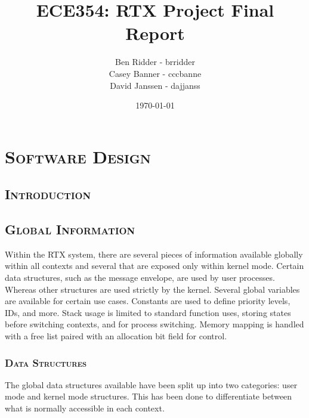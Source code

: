 \documentclass[oneside]{report}
\begin{document}
\lstset{language=C, 
        frame=single, 
        breaklines=true,
        basicstyle=\small\ttfamily,
        columns=fullflexible}


\title{ECE354: RTX Project Final Report}
\author{Ben Ridder - brridder \\
Casey Banner - cccbanne \\
David Janssen - dajjanss }
\date{\today}

\maketitle

\tableofcontents
\listoftables
\lstlistoflistings

\chapter{\textsc{Software Design}}

\section{\textsc{Introduction}}

\section{\textsc{Global Information}}


Within the RTX system, there are several pieces of information available
globally within all contexts and several that are exposed only within kernel
mode. Certain data structures, such as the message envelope, are used by
user processes. Whereas other structures are used strictly by the kernel. 
Several global variables are available for certain use cases. Constants are used 
to define priority levels, IDs, and more. Stack usage is limited to standard
function uses, storing states before switching contexts, and for process
switching. Memory mapping is handled with a free list paired with an allocation
bit field for control.

\subsection{\textsc{Data Structures}}
The global data structures available have been split up into two categories:
user mode and kernel mode structures. This has been done to differentiate
between what is normally accessible in each context.
\end{document}
